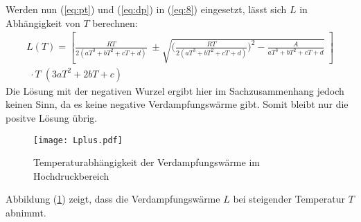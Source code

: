 Werden nun (\ref{eq:pt}) und (\ref{eq:dp}) in (\ref{eq:8}) eingesetzt, lässt sich
$L$ in Abhängigkeit von $T$ berechnen:
\begin{align*}
  L(T) = \left[\frac{RT}{2 (aT^3+bT^2+cT+d)} \; \pm \sqrt{\biggl(\frac{RT}{2(aT^3+bT^2+cT+d)}\biggr)^2
  -\frac{A}{aT^3+bT^2+cT+d}}\; \right] \\
  \;\cdot T \; (3aT^2+2bT+c)
\end{align*}
Die Lösung mit der negativen Wurzel ergibt hier im Sachzusammenhang jedoch keinen Sinn,
da es keine negative Verdampfungswärme gibt. Somit bleibt nur die positve Lösung übrig.
\begin{figure}[H]
  \centering
  \texttt{[image: Lplus.pdf]}
  \caption{Temperaturabhängigkeit der Verdampfungswärme im Hochdruckbereich}
  \label{fig:plus}
\end{figure}
Abbildung (\ref{fig:plus}) zeigt, dass die Verdampfungswärme $L$ bei steigender
Temperatur $T$ abnimmt.
